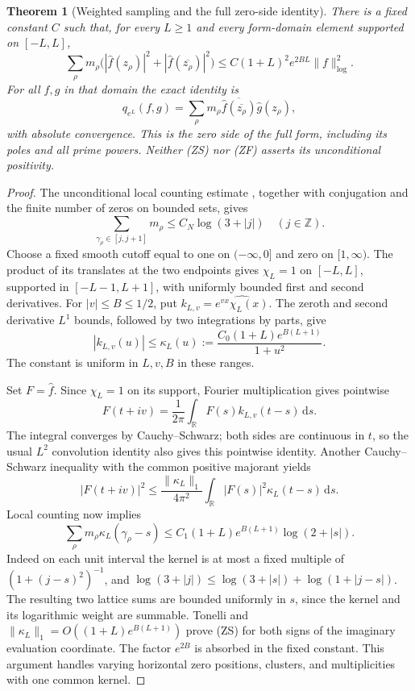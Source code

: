 \documentclass[11pt]{article}
\newtheorem{theorem}{Theorem}
\theoremstyle{remark}\newtheorem{remark}[theorem]{Remark}
\newcommand{\R}{\mathbb R}
\newcommand{\Z}{\mathbb Z}
\newcommand{\dd}{\,\mathrm d}
\begin{document}
\begin{theorem}[Weighted sampling and the full zero-side identity]
\label{thm:zero-sampling}
There is a fixed constant $C$ such that, for every $L\ge1$
and every form-domain element supported on $[-L,L]$,
\[
 \sum_\rho m_\rho
  \bigl(|\widehat f(z_\rho)|^2+
              |\widehat f(\overline{z_\rho})|^2\bigr)
       \le C(1+L)^2e^{2BL}\|f\|_{\log}^2.               \tag{ZS}
\]
For all $f,g$ in that domain the exact identity is
\[
 q_{e^L}(f,g)=\sum_\rho m_\rho
    \overline{\widehat f(\overline{z_\rho})}
                            \widehat g(z_\rho),         \tag{ZF}
\]
with absolute convergence. This is the zero side of the
full form, including its poles and all prime powers.
Neither (ZS) nor (ZF) asserts its unconditional positivity.
\end{theorem}
\begin{proof}
The unconditional local counting estimate
\cite[Lemma 9.4]{Kedlaya}, together with conjugation and the
finite number of zeros on bounded sets, gives
\[
 \sum_{\gamma_\rho\in[j,j+1]}m_\rho
                       \le C_N\log(3+|j|)\quad(j\in\Z).
\]
Choose a fixed smooth cutoff equal to one on $(-\infty,0]$
and zero on $[1,\infty)$. The product of its translates
at the two endpoints gives $\chi_L=1$ on $[-L,L]$,
supported in $[-L-1,L+1]$, with uniformly bounded first
and second derivatives. For $|v|\le B\le1/2$, put
$k_{L,v}=\widehat{e^{vx}\chi_L(x)}$.
The zeroth and second derivative $L^1$ bounds, followed
by two integrations by parts, give
\[
 |k_{L,v}(u)|\le\kappa_L(u):=
       \frac{C_0(1+L)e^{B(L+1)}}{1+u^2}.                \tag{KC}
\]
The constant is uniform in $L,v,B$ in these ranges.

Set $F=\widehat f$. Since $\chi_L=1$ on its support,
Fourier multiplication gives pointwise
\[
 F(t+iv)=\frac1{2\pi}\int_\R F(s)k_{L,v}(t-s)\dd s.
\]
The integral converges by Cauchy--Schwarz; both sides are
continuous in $t$, so the usual $L^2$ convolution identity
also gives this pointwise identity. Another Cauchy--Schwarz
inequality with the common positive majorant yields
\[
 |F(t+iv)|^2\le\frac{\|\kappa_L\|_1}{4\pi^2}
               \int_\R|F(s)|^2\kappa_L(t-s)\dd s.
\]
Local counting now implies
\[
 \sum_\rho m_\rho\kappa_L(\gamma_\rho-s)
 \le C_1(1+L)e^{B(L+1)}\log(2+|s|).
\]
Indeed on each unit interval the kernel is at most a
fixed multiple of $(1+(j-s)^2)^{-1}$, and
$\log(3+|j|)\le\log(3+|s|)+\log(1+|j-s|)$.
The resulting two lattice sums are bounded uniformly in
$s$, since the kernel and its logarithmic weight are
summable. Tonelli and
$\|\kappa_L\|_1=O((1+L)e^{B(L+1)})$ prove (ZS) for
both signs of the imaginary evaluation coordinate.
The factor $e^{2B}$ is absorbed in the fixed constant.
This argument handles varying horizontal zero positions,
clusters, and multiplicities with one common kernel.


\end{proof}
\end{document}
